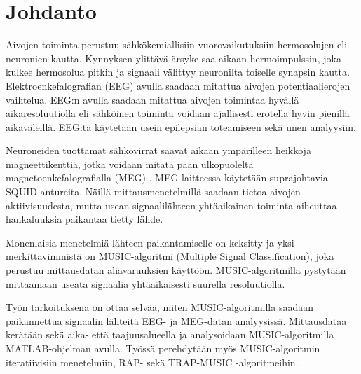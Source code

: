 \section{Johdanto}
Aivojen toiminta perustuu sähkökemiallisiin vuorovaikutuksiin hermosolujen eli neuronien kautta. Kynnyksen ylittävä ärsyke saa aikaan hermoimpulssin, joka kulkee hermosolua pitkin ja signaali välittyy neuronilta toiselle synapsin kautta.\cite{} 
Elektroenkefalografian (EEG) avulla saadaan mitattua aivojen potentiaalierojen vaihtelua. EEG:n avulla saadaan mitattua aivojen toimintaa hyvällä aikaresoluutiolla eli sähköinen toiminta voidaan ajallisesti erotella hyvin pienillä aikaväleillä. EEG:tä käytetään usein epilepsian toteamiseen sekä unen analyysiin. \cite{Nunez2006ElectricBrain}

    Neuroneiden tuottamat sähkövirrat saavat aikaan ympärilleen heikkoja magneettikenttiä, jotka voidaan mitata pään ulkopuolelta magnetoenkefalografialla (MEG) \cite{Hamalainen1993MagnetoencephalographytheoryBrain}. MEG-laitteessa käytetään suprajohtavia SQUID-antureita. 
Näillä mittausmenetelmillä saadaan tietoa aivojen aktiivisuudesta, mutta usean signaalilähteen yhtäaikainen toiminta aiheuttaa hankaluuksia paikantaa tietty lähde. 

    Monenlaisia menetelmiä lähteen paikantamiselle on keksitty ja yksi merkittävimmistä on MUSIC-algoritmi (Multiple Signal Classification), joka perustuu mittausdatan aliavaruuksien käyttöön. MUSIC-algoritmilla pystytään mittaamaan useata signaalia yhtäaikaisesti suurella resoluutiolla. \cite{Mosher1999SourceMUSIC}

    Työn tarkoituksena on ottaa selvää, miten MUSIC-algoritmilla saadaan paikannettua signaalin lähteitä EEG- ja MEG-datan analyysissä. Mittausdataa kerätään sekä aika- että taajuusalueella ja analysoidaan MUSIC-algoritmilla MATLAB-ohjelman avulla. Työssä perehdytään myös MUSIC-algoritmin iteratiivisiin menetelmiin, RAP- sekä TRAP-MUSIC -algoritmeihin.
